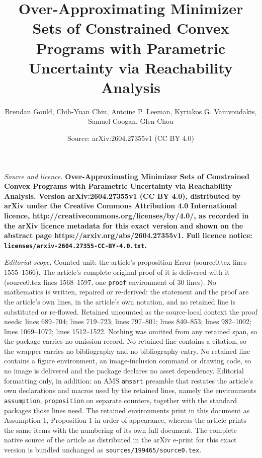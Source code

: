 \documentclass[10pt,a4paper]{amsart}
\title{\LARGE \bf Over-Approximating Minimizer Sets of Constrained Convex Programs with Parametric Uncertainty via Reachability Analysis}
\author{Brendan Gould, Chih-Yuan Chiu, Antoine P. Leeman, Kyriakos G. Vamvoudakis, Samuel Coogan, Glen Chou}
\date{Source: arXiv:2604.27355v1 (CC BY 4.0)}
\begin{document}
\maketitle

\noindent\emph{Source and licence.} \LARGE \bf Over-Approximating Minimizer Sets of Constrained Convex Programs with Parametric Uncertainty via Reachability Analysis. Version arXiv:2604.27355v1 (CC BY 4.0), distributed by arXiv under the Creative Commons Attribution 4.0 International licence, http://creativecommons.org/licenses/by/4.0/, as recorded in the arXiv licence metadata for this exact version and shown on the abstract page https://arxiv.org/abs/2604.27355v1. Full licence notice: \texttt{licenses/arxiv-2604.27355-CC-BY-4.0.txt}.\par\smallskip

\noindent\textit{Editorial scope.} Counted unit: the article's proposition Error (source0.tex lines 1555--1566). The article's complete original proof of it is delivered with it (source0.tex lines 1568--1597, one \texttt{proof} environment of 30 lines). No mathematics is written, repaired or re-derived: the statement and the proof are the article's own lines, in the article's own notation, and no retained line is substituted or re-flowed.  Retained uncounted as the source-local context the proof needs: lines 689--704; lines 719--723; lines 797--801; lines 840--853; lines 982--1002; lines 1069--1072; lines 1512--1522.  Nothing was omitted from any retained span, so the package carries no omission record.  No retained line contains a citation, so the wrapper carries no bibliography and no bibliography entry.  No retained line contains a figure environment, an image-inclusion command or drawing code, so no image is delivered and the package declares no asset dependency.  Editorial formatting only, in addition: an AMS \texttt{amsart} preamble that restates the article's own declarations and macros used by the retained lines, namely the environments \texttt{assumption}, \texttt{proposition} on separate counters, together with the standard packages those lines need.  The retained environments print in this document as Assumption 1, Proposition 1 in order of appearance, whereas the article prints the same items with the numbering of its own full document.  The complete native source of the article as distributed in the arXiv e-print for this exact version is bundled unchanged as \texttt{sources/199465/source0.tex}.
\end{document}
